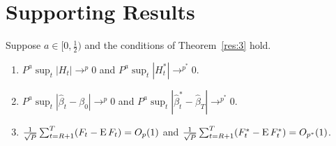 \documentclass[12pt,fleqn]{article}
\begin{document}
\section{Supporting Results}

\begin{lema}\label{res:a2}
  Suppose $a \in [0,\frac12)$ and the conditions of Theorem~\ref{res:3}
  hold.
  \begin{enumerate}
  \item $P^a \sup_t | H_{t} | \to^p 0$ and $P^a \sup_t | H_{t}^{*} |
    \to^{p^{*}} 0$.
  \item $P^a \sup_t | \hat{\beta}_{t} - \beta_{0} | \to^{p} 0$ and
    $P^a \sup_t | \hat{\beta}^{*}_{t} - \hat{\beta}_T |
    \to^{p^{*}} 0$.
  \item $\tfrac{1}{\sqrt{P}} \sum_{t=R+1}^T (F_t - \operatorname{E} F_t) = O_{p}(1)$
    and $\tfrac{1}{\sqrt{P}} \sum_{t=R+1}^T (F_t^* - \operatorname{E} F_t^*) =
    O_{p^*}(1)$.
  \end{enumerate}
\end{lema}
\end{document}
